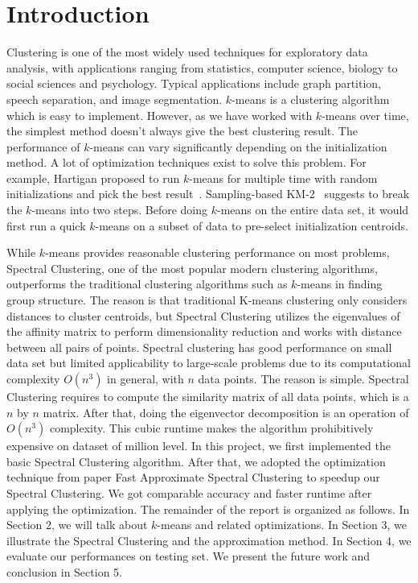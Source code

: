 \documentclass{acm_proc_article-sp}
\begin{document}
\section{Introduction}
Clustering is one of the most widely used techniques for exploratory data analysis,  with applications ranging from statistics, computer science, biology to social sciences and psychology. Typical applications include graph partition, speech separation, and image segmentation. $k$-means is a  
clustering algorithm which is easy to implement. However, as we have worked with $k$-means over time, the simplest method doesn't always give the best clustering result. The performance of $k$-means can vary significantly depending on the initialization method. A lot of optimization techniques exist to solve this problem. For example, Hartigan proposed to run $k$-means for multiple time with random initializations and pick the best result~\cite{hartigan1979algorithm}. Sampling-based KM-2~\cite{yan2009fast} suggests to break the $k$-means into two steps. Before doing $k$-means on the entire data set, it would first run a quick $k$-means on a subset of data to pre-select initialization centroids. 

While $k$-means provides reasonable clustering performance on most problems, 
Spectral Clustering, one of the most popular modern clustering algorithms, outperforms the traditional clustering algorithms such as $k$-means in finding group structure. The reason is that traditional K-means clustering only considers distances to cluster centroids, but Spectral Clustering utilizes the eigenvalues of the affinity matrix to perform dimensionality reduction and works with distance between all pairs of points. Spectral clustering has good performance on small data set but limited applicability to large-scale problems due to its computational complexity $O(n^3)$ in general, with $n$ data points. The reason is simple. Spectral Clustering requires to compute the similarity matrix of all data points, which is a $n$ by $n$ matrix. After that, doing the eigenvector decomposition is an operation of 
$O(n^3)$ complexity. This cubic runtime makes the algorithm prohibitively expensive on dataset of million level. In this project, we first implemented the basic Spectral Clustering algorithm. After that, we adopted the optimization technique from paper Fast Approximate Spectral Clustering \cite{yan2009fast} to speedup our Spectral Clustering. We got comparable accuracy and faster runtime after applying the optimization. The remainder of the report is organized as follows. In Section 2, we will talk about $k$-means and related optimizations. In Section 3, we illustrate the Spectral Clustering and the approximation method. In Section 4, we evaluate our performances on testing set. We present the future work and conclusion in Section 5.
\end{document}

